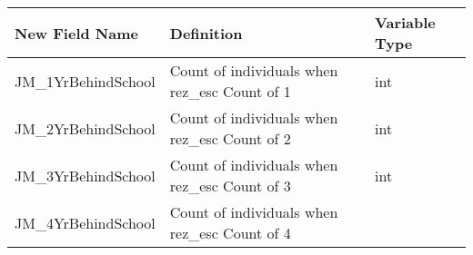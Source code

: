 \documentclass[11pt]{article}
\begin{document}
\begin{longtable}[]{@{}lll@{}}
\toprule
\begin{minipage}[b]{0.63\columnwidth}\raggedright\strut
New Field Name\strut
\end{minipage} & \begin{minipage}[b]{0.12\columnwidth}\raggedright\strut
Definition\strut
\end{minipage} & \begin{minipage}[b]{0.16\columnwidth}\raggedright\strut
Variable Type\strut
\end{minipage}\tabularnewline
\midrule
\endhead
\begin{minipage}[t]{0.63\columnwidth}\raggedright\strut
JM\_1YrBehindSchool\strut
\end{minipage} & \begin{minipage}[t]{0.12\columnwidth}\raggedright\strut
Count of individuals when rez\_esc Count of 1\strut
\end{minipage} & \begin{minipage}[t]{0.16\columnwidth}\raggedright\strut
int\strut
\end{minipage}\tabularnewline
\begin{minipage}[t]{0.63\columnwidth}\raggedright\strut
JM\_2YrBehindSchool\strut
\end{minipage} & \begin{minipage}[t]{0.12\columnwidth}\raggedright\strut
Count of individuals when rez\_esc Count of 2\strut
\end{minipage} & \begin{minipage}[t]{0.16\columnwidth}\raggedright\strut
int\strut
\end{minipage}\tabularnewline
\begin{minipage}[t]{0.63\columnwidth}\raggedright\strut
JM\_3YrBehindSchool\strut
\end{minipage} & \begin{minipage}[t]{0.12\columnwidth}\raggedright\strut
Count of individuals when rez\_esc Count of 3\strut
\end{minipage} & \begin{minipage}[t]{0.16\columnwidth}\raggedright\strut
int\strut
\end{minipage}\tabularnewline
\begin{minipage}[t]{0.63\columnwidth}\raggedright\strut
JM\_4YrBehindSchool\strut
\end{minipage} & \begin{minipage}[t]{0.12\columnwidth}\raggedright\strut
Count of individuals when rez\_esc Count of 4\strut

\end{minipage}
\end{longtable}
\end{document}
